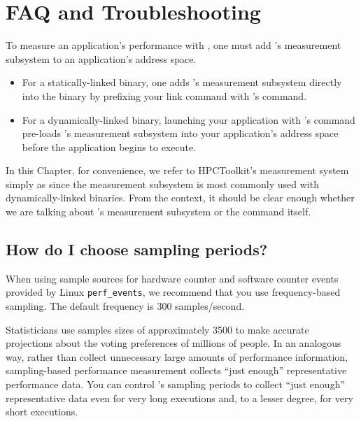 \documentclass[11pt,letterpaper]{report}
\begin{document}
\chapter{FAQ and Troubleshooting}
\label{chpt:faq-troubleshooting}

To measure an application's performance with \HPCToolkit, one must add
\HPCToolkit's measurement subsystem to an application's address
space.  
\begin{itemize}
\item
For a statically-linked binary, one adds \HPCToolkit's
measurement subsystem directly into the binary 
by prefixing your link command
with \HPCToolkit{}'s \hpclink{} command.  
\item 
For a dynamically-linked
binary, launching your application with \HPCToolkit's \hpcrun{}
command pre-loads \HPCToolkit's measurement subsystem into your
application's address space before the application begins to execute. 
\end{itemize}
In this Chapter, for convenience, we refer to HPCToolkit's measurement
system simply as \hpcrun{} since the measurement subsystem is most commonly used
with dynamically-linked binaries. From the context, it should be clear enough
whether we are talking about \HPCToolkit's measurement subsystem
or the \hpcrun{} command itself.



\section{How do I choose \hpcrun{} sampling periods?}
\label{sec:troubleshooting:hpcrun-sample-periods}

When using sample sources for hardware counter and software counter events provided by Linux \verb|perf_events|, 
we recommend that you use frequency-based sampling. The default frequency is 300 samples/second. 

Statisticians use samples sizes of approximately 3500 to make accurate projections about the voting preferences of millions of people.
In an analogous way, rather than collect unnecessary large amounts of performance information, sampling-based performance measurement collects ``just enough'' representative performance data.
You can control \hpcrun{}'s sampling periods to collect ``just enough'' representative data even for very long executions and, to a lesser degree, for very short executions.
\end{document}
